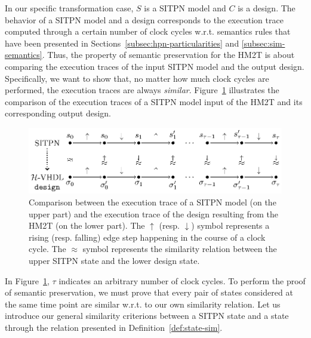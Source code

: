 In our specific transformation case, $S$ is a SITPN model and $C$ is a
\hvhdl{} design. The behavior of a SITPN model and a \hvhdl{} design
corresponds to the execution trace computed through a certain number
of clock cycles w.r.t. semantics rules that have been presented in
Sections~\ref{subsec:hpn-particularities} and
\ref{subsec:sim-semantics}. Thus, the property of semantic
preservation for the HM2T is about comparing the execution traces of
the input SITPN model and the output \hvhdl{} design. Specifically, we
want to show that, no matter how much clock cycles are performed, the
execution traces are always
\textit{similar}. Figure~\ref{fig:trace-comparison} illustrates the
comparison of the execution traces of a SITPN model input of the HM2T
and its corresponding output design.
\begin{figure}[!ht]
  \centering
  \includegraphics[keepaspectratio,width=\textwidth]{trace-comparison-full.eps}
  \caption{Comparison between the execution trace of a SITPN model (on
    the upper part) and the execution trace of the \hvhdl{} design
    resulting from the HM2T (on the lower part). The $\uparrow$
    (resp. $\downarrow$) symbol represents a rising (resp. falling)
    edge step happening in the course of a clock cycle. The $\approx$
    symbol represents the similarity relation between the upper SITPN
    state and the lower \hvhdl{} design state.}
  \label{fig:trace-comparison}
\end{figure}

In Figure~\ref{fig:trace-comparison}, $\tau$ indicates an arbitrary
number of clock cycles. To perform the proof of semantic preservation,
we must prove that every pair of states considered at the same time
point are similar w.r.t. to our own similarity relation.  Let us
introduce our general similarity criterions between a SITPN state and
a \hvhdl{} state through the relation presented in
Definition~\ref{def:state-sim}.

